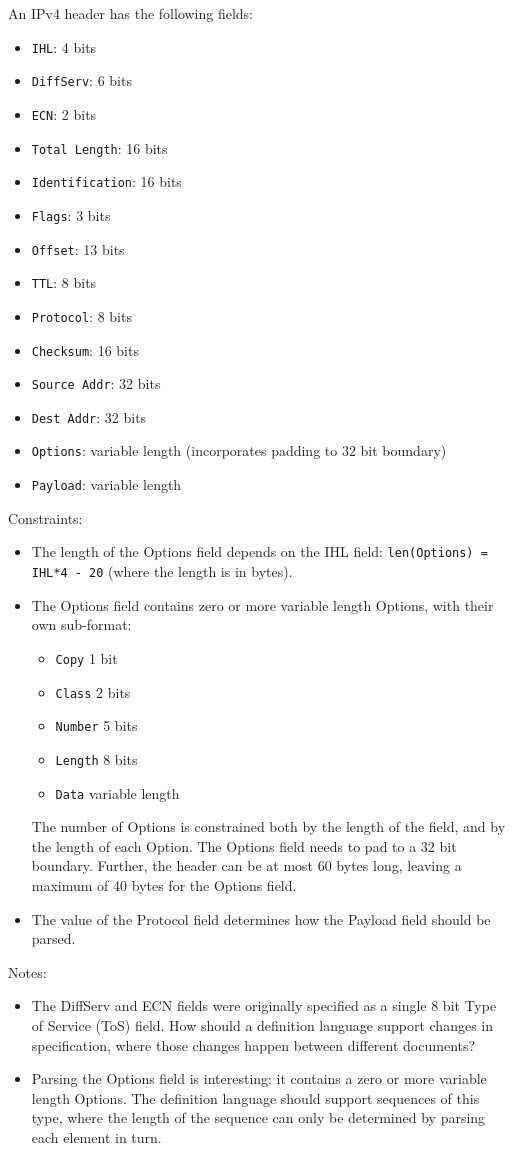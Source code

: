 \documentclass[10pt,a4paper]{article}
\begin{document}
An IPv4 header has the following fields:
\begin{itemize}
\item \texttt{IHL}: 4 bits
\item \texttt{DiffServ}: 6 bits
\item \texttt{ECN}: 2 bits
\item \texttt{Total Length}: 16 bits
\item \texttt{Identification}: 16 bits
\item \texttt{Flags}: 3 bits
\item \texttt{Offset}: 13 bits
\item \texttt{TTL}: 8 bits
\item \texttt{Protocol}: 8 bits
\item \texttt{Checksum}: 16 bits
\item \texttt{Source Addr}: 32 bits
\item \texttt{Dest Addr}: 32 bits
\item \texttt{Options}: variable length (incorporates padding to 32 bit boundary)
\item \texttt{Payload}: variable length
\end{itemize}

Constraints:
\begin{itemize}
\item The length of the Options field depends on the IHL field:
\texttt{len(Options) = IHL*4 - 20} (where the length is in bytes).
\item The Options field contains zero or more variable length Options, with their own
sub-format:
\begin{itemize}
\item \texttt{Copy} 1 bit
\item \texttt{Class} 2 bits
\item \texttt{Number} 5 bits
\item \texttt{Length} 8 bits
\item \texttt{Data} variable length
\end{itemize}
The number of Options is constrained both by the length of the field, and by the length
of each Option. The Options field needs to pad to a 32 bit boundary. Further, the
header can be at most 60 bytes long, leaving a maximum of 40 bytes for the Options field.
\item The value of the Protocol field determines how the Payload field should be parsed.
\end{itemize}

Notes:
\begin{itemize}
\item The DiffServ and ECN fields were originally specified as a single 8 bit 
Type of Service (ToS) field. How should a definition language support changes in
specification, where those changes happen between different documents?
\item Parsing the Options field is interesting: it contains a zero or more variable
length Options. The definition language should support sequences of this type, where the
length of the sequence can only be determined by parsing each element in turn.
\end{itemize}
\end{document}

